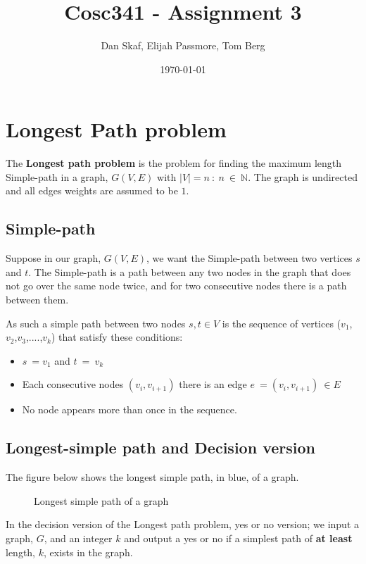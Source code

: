\documentclass[a4paper,11pt]{article}
\title{Cosc341 - Assignment 3}
\author{Dan Skaf, Elijah Passmore, Tom Berg}
\date{\today}
\begin{document}
\maketitle

\section{Longest Path problem}
The \textbf{Longest path problem} is the problem for finding the maximum length 
Simple-path in a graph, $G(V,E)$ with $\left|V\right|=n\::\:n\:\in\:\mathbb{N}$.
The graph is undirected and all edges weights are assumed to be $1$.

    \subsection{Simple-path} 
    Suppose in our graph, $G(V,E)$, we want the Simple-path between two vertices 
    $s$ and $t$. The Simple-path is a path between any two nodes in the graph 
    that does not go over the same node twice, and for two consecutive nodes 
    there is a path between them.

    As such a simple path between two nodes $s,t\in V$ is the sequence of 
    vertices ($v_1$,$v_2$,$v_3$,$....$,$v_k$) that satisfy these conditions:
    \begin{itemize}
        \item $s\:=v_1$ and $t\:=\:v_k$
        \item Each consecutive nodes $\left(v_i,v_{i+1}\right)$ there is an 
        edge $e\:=\left(v_i,v_{i+1}\right)\:\in E$
        \item No node appears more than once in the sequence.
    \end{itemize}

    \subsection{Longest-simple path and Decision version}
    The figure below shows the longest simple path, in blue, of a graph.
    \begin{figure}[!h]
        \centering {}
        \caption{Longest simple path of a graph}
    \end{figure}

    In the decision version of the Longest path problem, yes or no version; 
    we input a graph, $G$, and an integer $k$ and output a yes or no if a 
    simplest path of \textbf{at least} length, $k$, exists in the graph.
\end{document}
